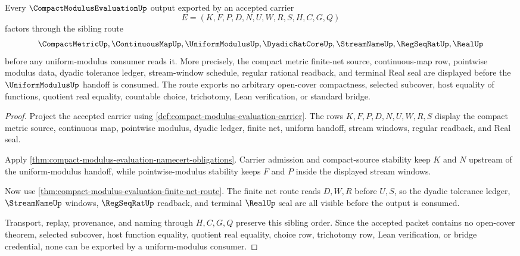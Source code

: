 \begin{theorem}
\label{thm:compact-modulus-evaluation-sibling-route}
Every $\CompactModulusEvaluationUp$ output exported by an accepted carrier
$$
E=(K,F,P,D,N,U,W,R,S,H,C,G,Q)
$$
factors through the sibling route
$$
\CompactMetricUp,\ContinuousMapUp,\UniformModulusUp,\DyadicRatCoreUp,\StreamNameUp,\RegSeqRatUp,\RealUp
$$
before any uniform-modulus consumer reads it. More precisely, the compact
metric finite-net source, continuous-map row, pointwise modulus data, dyadic
tolerance ledger, stream-window schedule, regular rational readback, and
terminal Real seal are displayed before the $\UniformModulusUp$ handoff is
consumed. The route exports no arbitrary open-cover compactness, selected
subcover, host equality of functions, quotient real equality, countable choice,
trichotomy, Lean verification, or standard bridge.
\end{theorem}
\begin{proof}
Project the accepted carrier using
\autoref{def:compact-modulus-evaluation-carrier}. The rows $K,F,P,D,N,U,W,R,S$
display the compact metric source, continuous map, pointwise modulus, dyadic
ledger, finite net, uniform handoff, stream windows, regular readback, and Real
seal.

Apply \autoref{thm:compact-modulus-evaluation-namecert-obligations}. Carrier
admission and compact-source stability keep $K$ and $N$ upstream of the
uniform-modulus handoff, while pointwise-modulus stability keeps $F$ and $P$
inside the displayed stream windows.

Now use \autoref{thm:compact-modulus-evaluation-finite-net-route}. The finite
net route reads $D,W,R$ before $U,S$, so the dyadic tolerance ledger,
$\StreamNameUp$ windows, $\RegSeqRatUp$ readback, and terminal $\RealUp$ seal
are all visible before the output is consumed.

Transport, replay, provenance, and naming through $H,C,G,Q$ preserve this
sibling order. Since the accepted packet contains no open-cover theorem,
selected subcover, host function equality, quotient real equality, choice row,
trichotomy row, Lean verification, or bridge credential, none can be exported
by a uniform-modulus consumer.
\end{proof}


